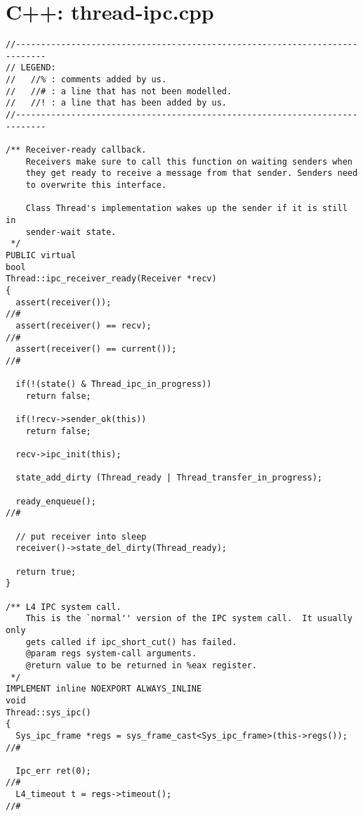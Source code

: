 \hypertarget{c++_thread_ipc}{\chapter{C++: thread-ipc.cpp}}
\lstset{language=C++}
\begin{lstlisting}
//----------------------------------------------------------------------------
// LEGEND:
//   //% : comments added by us.
//   //# : a line that has not been modelled.
//   //! : a line that has been added by us.
//----------------------------------------------------------------------------

/** Receiver-ready callback.  
    Receivers make sure to call this function on waiting senders when
    they get ready to receive a message from that sender. Senders need
    to overwrite this interface.

    Class Thread's implementation wakes up the sender if it is still in
    sender-wait state.
 */
PUBLIC virtual
bool
Thread::ipc_receiver_ready(Receiver *recv)
{
  assert(receiver());                                                      //#
  assert(receiver() == recv);                                              //#
  assert(receiver() == current());                                         //#

  if(!(state() & Thread_ipc_in_progress))
    return false;

  if(!recv->sender_ok(this))
    return false;
  
  recv->ipc_init(this);

  state_add_dirty (Thread_ready | Thread_transfer_in_progress);

  ready_enqueue();                                                         //#

  // put receiver into sleep
  receiver()->state_del_dirty(Thread_ready);

  return true;
}

/** L4 IPC system call.
    This is the `normal'' version of the IPC system call.  It usually only
    gets called if ipc_short_cut() has failed.
    @param regs system-call arguments.
    @return value to be returned in %eax register.
 */
IMPLEMENT inline NOEXPORT ALWAYS_INLINE
void
Thread::sys_ipc()
{
  Sys_ipc_frame *regs = sys_frame_cast<Sys_ipc_frame>(this->regs());       //#

  Ipc_err ret(0);                                                          //# 
  L4_timeout t = regs->timeout();                                          //#


\end{lstlisting}
